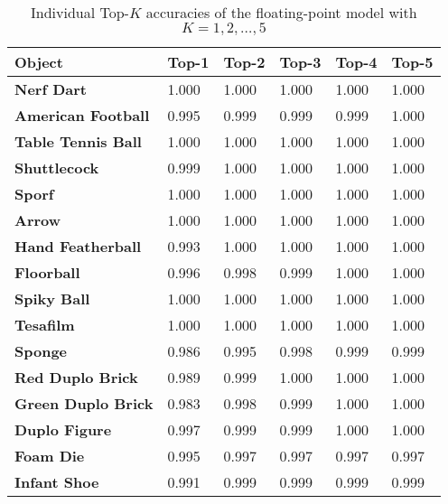 \begin{table}
  \caption{Individual Top-$K$ accuracies of the floating-point model with $K = 1, 2, \dots, 5$}
  \label{tab:individual_top_k_training}
  \centering
  \begin{tabular}{llllll}
    \toprule
    \textbf{Object} & \textbf{Top-1} & \textbf{Top-2} & \textbf{Top-3} & \textbf{Top-4} & \textbf{Top-5} \\
    \midrule
    \textbf{Nerf Dart} & \num{1.000} & \num{1.000} & \num{1.000} & \num{1.000} & \num{1.000} \\
    \textbf{American Football} & \num{0.995} & \num{0.999} & \num{0.999} & \num{0.999} & \num{1.000} \\
    \textbf{Table Tennis Ball} & \num{1.000} & \num{1.000} & \num{1.000} & \num{1.000} & \num{1.000} \\
    \textbf{Shuttlecock} & \num{0.999} & \num{1.000} & \num{1.000} & \num{1.000} & \num{1.000} \\
    \textbf{Sporf} & \num{1.000} & \num{1.000} & \num{1.000} & \num{1.000} & \num{1.000} \\
    \textbf{Arrow} & \num{1.000} & \num{1.000} & \num{1.000} & \num{1.000} & \num{1.000} \\
    \textbf{Hand Featherball} & \num{0.993} & \num{1.000} & \num{1.000} & \num{1.000} & \num{1.000} \\
    \textbf{Floorball} & \num{0.996} & \num{0.998} & \num{0.999} & \num{1.000} & \num{1.000} \\
    \textbf{Spiky Ball} & \num{1.000} & \num{1.000} & \num{1.000} & \num{1.000} & \num{1.000} \\
    \textbf{Tesafilm} & \num{1.000} & \num{1.000} & \num{1.000} & \num{1.000} & \num{1.000} \\
    \textbf{Sponge} & \num{0.986} & \num{0.995} & \num{0.998} & \num{0.999} & \num{0.999} \\
    \textbf{Red Duplo Brick} & \num{0.989} & \num{0.999} & \num{1.000} & \num{1.000} & \num{1.000} \\
    \textbf{Green Duplo Brick} & \num{0.983} & \num{0.998} & \num{0.999} & \num{1.000} & \num{1.000} \\
    \textbf{Duplo Figure} & \num{0.997} & \num{0.999} & \num{0.999} & \num{1.000} & \num{1.000} \\
    \textbf{Foam Die} & \num{0.995} & \num{0.997} & \num{0.997} & \num{0.997} & \num{0.997} \\
    \textbf{Infant Shoe} & \num{0.991} & \num{0.999} & \num{0.999} & \num{0.999} & \num{0.999} \\

\end{tabular}
\end{table}
